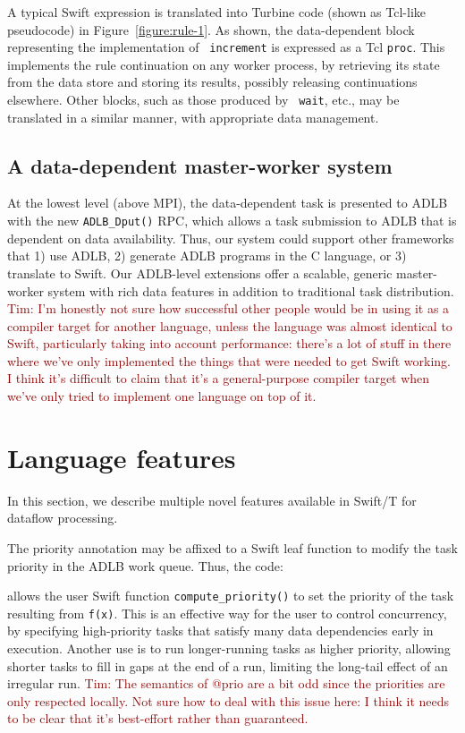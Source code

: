 \documentclass[conference,10pt]{IEEEtran}
\newcommand{\arm}[1]{ {\textcolor{darkred} { Tim: #1 }}}
\newcommand{\arm}[1]{}
\begin{document}
A typical Swift expression is translated into Turbine code (shown as
Tcl-like pseudocode) in Figure~\ref{figure:rule-1}.  As shown, the
data-dependent block representing the implementation of {\tt
  increment} is expressed as a Tcl {\tt proc}.  This implements the
rule continuation on any worker process, by retrieving its state from
the data store and storing its results, possibly releasing
continuations elsewhere.  Other blocks, such as those produced by {\tt
  wait}, etc., may be translated in a similar manner, with appropriate
data management.

\subsection{A data-dependent master-worker system}

At the lowest level (above MPI), the data-dependent task is presented
to ADLB with the new {\tt ADLB\_Dput()} RPC, which allows a task
submission to ADLB that is dependent on data availability.  Thus, our
system could support other frameworks that 1) use ADLB, 2) generate ADLB
programs in the C language, or 3) translate
to Swift.  Our ADLB-level extensions offer a scalable, generic
master-worker system with rich data features in addition to
traditional task distribution.
\arm{I'm honestly not sure how successful other people would be
in using it as a compiler target for another language, unless
the language was almost identical to Swift, particularly taking
into account performance: there's a lot of stuff in there where
we've only implemented the things that were needed to get Swift
working.  I think it's difficult to claim that
it's a general-purpose compiler target when we've only tried
to implement one language on top of it.}

\section{Language features}
\label{section:features}

In this section, we describe multiple novel features available in
Swift/T for dataflow processing.  

The priority annotation may be affixed to a Swift leaf function to
modify the task priority in the ADLB work queue.  Thus, the code: 

allows the user Swift function {\tt compute\_priority()} to set the priority
of the task resulting from {\tt f(x)}.  This is an effective way for
the user to control concurrency, by specifying high-priority tasks
that satisfy many data dependencies early in execution.  Another use
is to run longer-running tasks as higher priority, allowing shorter
tasks to fill in gaps at the end of a run, limiting the long-tail
effect of an irregular run. 
\arm{The semantics of @prio are a bit odd since the priorities are
only respected locally.  Not sure how to deal with this issue here:
I think it needs to be clear that it's best-effort rather than guaranteed.}
\end{document}
